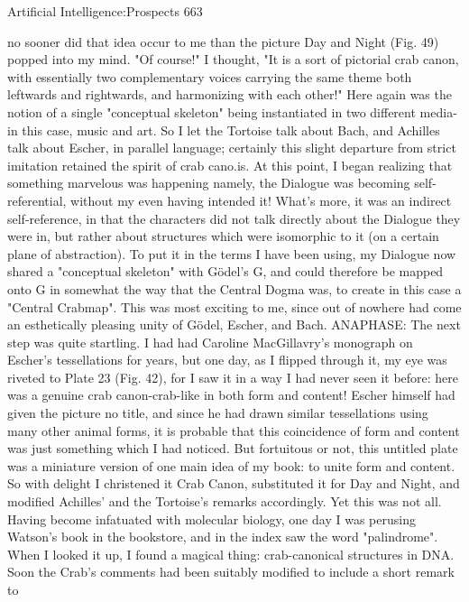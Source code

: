 Artificial Intelligence:Prospects                                                          663

no sooner did that idea occur to me than the picture Day and Night (Fig. 49) popped into
my mind. "Of course!" I thought, "It is a sort of pictorial crab canon, with essentially two
complementary voices carrying the same theme both leftwards and rightwards, and
harmonizing with each other!" Here again was the notion of a single "conceptual
skeleton" being instantiated in two different media-in this case, music and art. So I let the
Tortoise talk about Bach, and Achilles talk about Escher, in parallel language; certainly
this slight departure from strict imitation retained the spirit of crab cano.is.
         At this point, I began realizing that something marvelous was happening namely,
the Dialogue was becoming self-referential, without my even having intended it! What's
more, it was an indirect self-reference, in that the characters did not talk directly about
the Dialogue they were in, but rather about structures which were isomorphic to it (on a
certain plane of abstraction). To put it in the terms I have been using, my Dialogue now
shared a "conceptual skeleton" with Gödel’s G, and could therefore be mapped onto G in
somewhat the way that the Central Dogma was, to create in this case a "Central
Crabmap". This was most exciting to me, since out of nowhere had come an esthetically
pleasing unity of Gödel, Escher, and Bach.
         ANAPHASE: The next step was quite startling. I had had Caroline MacGillavry's
monograph on Escher's tessellations for years, but one day, as I flipped through it, my
eye was riveted to Plate 23 (Fig. 42), for I saw it in a way I had never seen it before: here
was a genuine crab canon-crab-like in both form and content! Escher himself had given
the picture no title, and since he had drawn similar tessellations using many other animal
forms, it is probable that this coincidence of form and content was just something which I
had noticed. But fortuitous or not, this untitled plate was a miniature version of one main
idea of my book: to unite form and content. So with delight I christened it Crab Canon,
substituted it for Day and Night, and modified Achilles' and the Tortoise's remarks
accordingly.
         Yet this was not all. Having become infatuated with molecular biology, one day I
was perusing Watson's book in the bookstore, and in the index saw the word
"palindrome". When I looked it up, I found a magical thing: crab-canonical structures in
DNA. Soon the Crab's comments had been suitably modified to include a short remark to
